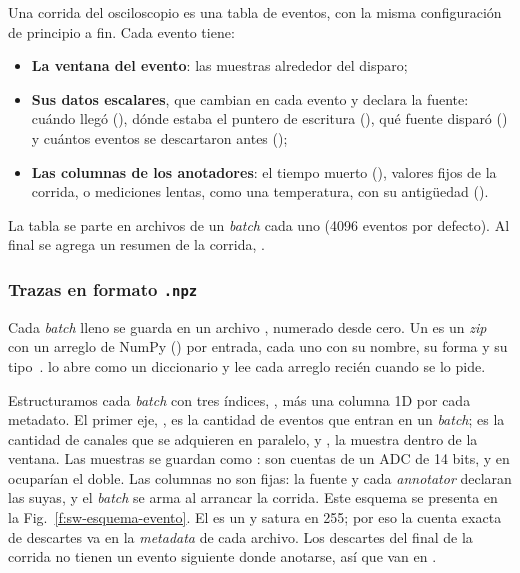 Una corrida del osciloscopio es una tabla de eventos, con la misma configuración
de principio a fin. Cada evento tiene:
\begin{itemize}
  \item \textbf{La ventana del evento}: las muestras alrededor del disparo;
  \item \textbf{Sus datos escalares}, que cambian en cada evento y declara la
    fuente: cuándo llegó (), dónde estaba el puntero de escritura
    (), qué fuente disparó () y cuántos eventos se
    descartaron antes ();
  \item \textbf{Las columnas de los anotadores}: el tiempo muerto
    (), valores fijos de la corrida, o mediciones lentas, como
    una temperatura, con su antigüedad ().
\end{itemize}
La tabla se parte en archivos de un \emph{batch} cada uno (4096 eventos por defecto). Al
final se agrega un resumen de la corrida, .

\subsubsection{Trazas en formato \texorpdfstring{\texttt{.npz}}{.npz}}

Cada \emph{batch} lleno se guarda en un archivo , numerado desde
cero. Un  es un \emph{zip} con un arreglo de NumPy () por
entrada, cada uno con su nombre, su forma y su tipo~\cite{NumpyNEP1}.
 lo abre como un diccionario y lee cada arreglo recién cuando se
lo pide.

Estructuramos cada \emph{batch} con tres índices, ,
más una columna 1D por cada metadato. El primer eje, , es la
cantidad de eventos que entran en un \emph{batch};  es la cantidad de
canales que se adquieren en paralelo, y , la muestra dentro de
la ventana. Las muestras se guardan como : son cuentas de un ADC
de 14 bits, y en  ocuparían el doble. Las columnas no son fijas:
la fuente y cada \emph{annotator} declaran las suyas, y el \emph{batch} se arma al arrancar la
corrida. Este esquema se presenta en la Fig.~\ref{f:sw-esquema-evento}. El
 es un  y satura en 255; por eso la cuenta exacta de
descartes va en la \emph{metadata} de cada archivo. Los descartes del final de la
corrida no tienen un evento siguiente donde anotarse, así que van en
.

